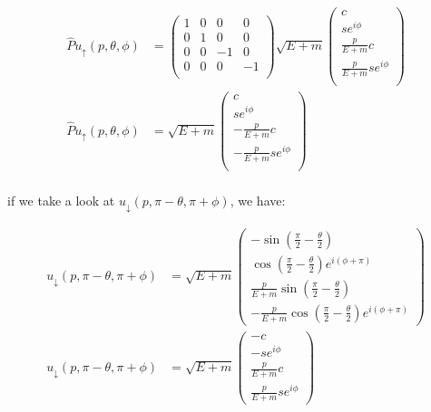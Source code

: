\documentclass[11pt]{article}
\theoremstyle{definition}
\begin{document}
\begin{align}
    \hat{P}u_{\uparrow}(p,\theta,\phi) &= 
    \begin{pmatrix}
        1 & 0 & 0 & 0\\
        0 & 1 & 0 & 0\\
        0 & 0 & -1 & 0\\
        0 & 0 & 0 & -1\\
    \end{pmatrix}
    \sqrt{E+m}
    \begin{pmatrix}
        c\\
        se^{i\phi}\\
        \frac{p}{E+m}c\\
        \frac{p}{E+m}se^{i\phi}\\
    \end{pmatrix}\\
    \hat{P}u_{\uparrow}(p,\theta,\phi) &=
    \sqrt{E+m}
    \begin{pmatrix}
        c\\
        se^{i\phi}\\
        -\frac{p}{E+m}c\\
        -\frac{p}{E+m}se^{i\phi}\\
    \end{pmatrix}\\
\end{align}

if we take a look at $u_{\downarrow}(p,\pi-\theta,\pi+\phi)$, we have:

\begin{align}
    u_{\downarrow}(p,\pi-\theta,\pi+\phi) &=
    \sqrt{E+m}
    \begin{pmatrix}
        -\sin(\frac{\pi}{2}-\frac{\theta}{2})\\
        \cos(\frac{\pi}{2}-\frac{\theta}{2})e^{i(\phi+\pi)}\\
        \frac{p}{E+m}\sin(\frac{\pi}{2}-\frac{\theta}{2})\\
        -\frac{p}{E+m}\cos(\frac{\pi}{2}-\frac{\theta}{2})e^{i(\phi+\pi)}
    \end{pmatrix}\\
    u_{\downarrow}(p,\pi-\theta,\pi+\phi) &=
    \sqrt{E+m}
    \begin{pmatrix}
        -c\\
        -se^{i\phi}\\
        \frac{p}{E+m}c\\
        \frac{p}{E+m}se^{i\phi}
    \end{pmatrix}
\end{align}
\end{document}
